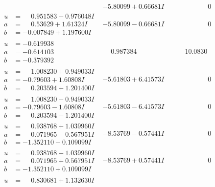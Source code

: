 \documentclass[1p]{elsarticle_modified}
\theoremstyle{definition}
\begin{document}
$$\begin{array}{c|c|c}
 & -5.80099 + 0.66681 I & \phantom{-0.000000 } 0 \\ \hline\begin{aligned}
u &= \phantom{-}0.951583 - 0.976048 I \\
a &= \phantom{-}0.53629 + 1.61324 I \\
b &= -0.007849 + 1.197600 I\end{aligned}
 & -5.80099 - 0.66681 I & \phantom{-0.000000 } 0 \\ \hline\begin{aligned}
u &= -0.619938\phantom{ +0.000000I} \\
a &= -0.614103\phantom{ +0.000000I} \\
b &= -0.379392\phantom{ +0.000000I}\end{aligned}
 & \phantom{-}0.987384\phantom{ +0.000000I} & \phantom{-}10.0830\phantom{ +0.000000I} \\ \hline\begin{aligned}
u &= \phantom{-}1.008230 + 0.949033 I \\
a &= -0.79603 + 1.60808 I \\
b &= \phantom{-}0.203594 + 1.201400 I\end{aligned}
 & -5.61803 + 6.41573 I & \phantom{-0.000000 } 0 \\ \hline\begin{aligned}
u &= \phantom{-}1.008230 - 0.949033 I \\
a &= -0.79603 - 1.60808 I \\
b &= \phantom{-}0.203594 - 1.201400 I\end{aligned}
 & -5.61803 - 6.41573 I & \phantom{-0.000000 } 0 \\ \hline\begin{aligned}
u &= \phantom{-}0.938768 + 1.039960 I \\
a &= \phantom{-}0.071965 - 0.567951 I \\
b &= -1.352110 - 0.109099 I\end{aligned}
 & -8.53769 - 0.57441 I & \phantom{-0.000000 } 0 \\ \hline\begin{aligned}
u &= \phantom{-}0.938768 - 1.039960 I \\
a &= \phantom{-}0.071965 + 0.567951 I \\
b &= -1.352110 + 0.109099 I\end{aligned}
 & -8.53769 + 0.57441 I & \phantom{-0.000000 } 0 \\ \hline\begin{aligned}
u &= \phantom{-}0.830681 + 1.132630 I \\

\end{aligned}
\end{array}$$
\end{document}
